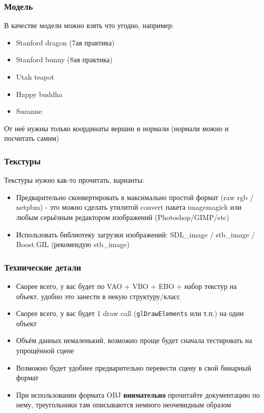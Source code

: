 \documentclass{beamer}
\begin{document}
\begin{frame}[fragile]
\frametitle{Модель}
В качестве модели можно взять что угодно, например:
\begin{itemize}
\item Stanford dragon (7ая практика)
\item Stanford bunny (8ая практика)
\item Utah teapot
\item Happy buddha
\item Suzanne
\end{itemize}
От неё нужны только координаты вершин и нормали (нормали можно и посчитать самим)
\end{frame}

\begin{frame}[fragile]
\frametitle{Текстуры}
Текстуры нужно как-то прочитать, варианты:
\begin{itemize}
\item Предварительно сконвертировать в максимально простой формат (raw rgb / netpbm) - это можно сделать утилитой convert пакета imagemagick или любым серьёзным редактором изображений (Photoshop/GIMP/etc)
\item Использовать библиотеку загрузки изображений: SDL\_image / stb\_image / Boost.GIL (рекомендую stb\_image)
\end{itemize}
\end{frame}

\begin{frame}[fragile]
\frametitle{Технические детали}
\begin{itemize}
\item Скорее всего, у вас будет по VAO + VBO + EBO + набор текстур на объект, удобно это занести в некую структуру/класс
\item Скорее всего, у вас будет 1 draw call (\verb|glDrawElements| или т.п.) на один объект
\item Объём данных немаленький, возможно проще будет сначала тестировать на упрощённой сцене
\item Возможно будет удобнее предварительно перевести сцену в свой бинарный формат
\item При использовании формата OBJ \textbf{внимательно} прочитайте документацию по нему, треугольники там описываются немного неочевидным образом
\end{itemize}
\end{frame}
\end{document}
